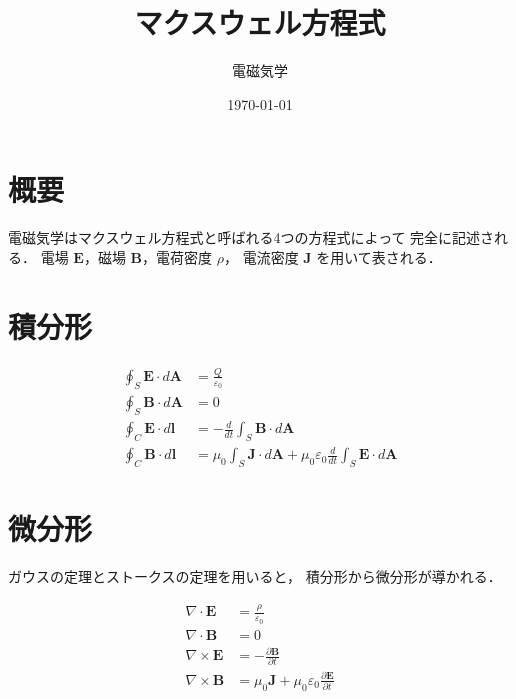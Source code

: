 \documentclass[lualatex, a4paper, 12pt]{jlreq}
\title{マクスウェル方程式}
\author{電磁気学}
\date{\today}
\begin{document}
\maketitle

\section{概要}

電磁気学はマクスウェル方程式と呼ばれる4つの方程式によって
完全に記述される．
電場 $\bm{E}$，磁場 $\bm{B}$，電荷密度 $\rho$，
電流密度 $\bm{J}$ を用いて表される．

\section{積分形}

\begin{align}
  \oint_S \bm{E} \cdot d\bm{A}
    &= \frac{Q}{\varepsilon_0}
    \tag{ガウスの法則}
    \label{eq:gauss_e}
    \\[8pt]
  \oint_S \bm{B} \cdot d\bm{A}
    &= 0
    \tag{磁気のガウスの法則}
    \label{eq:gauss_b}
    \\[8pt]
  \oint_C \bm{E} \cdot d\bm{l}
    &= -\frac{d}{dt} \int_S \bm{B} \cdot d\bm{A}
    \tag{ファラデーの法則}
    \label{eq:faraday}
    \\[8pt]
  \oint_C \bm{B} \cdot d\bm{l}
    &= \mu_0 \int_S \bm{J} \cdot d\bm{A}
       + \mu_0 \varepsilon_0 \frac{d}{dt}
         \int_S \bm{E} \cdot d\bm{A}
    \tag{アンペール--マクスウェルの法則}
    \label{eq:ampere}
\end{align}

\section{微分形}

ガウスの定理とストークスの定理を用いると，
積分形から微分形が導かれる．

\begin{align}
  \nabla \cdot \bm{E}
    &= \frac{\rho}{\varepsilon_0}
    \tag{ガウスの法則}
    \label{eq:gauss_e_diff}
    \\[8pt]
  \nabla \cdot \bm{B}
    &= 0
    \tag{磁気のガウスの法則}
    \label{eq:gauss_b_diff}
    \\[8pt]
  \nabla \times \bm{E}
    &= -\frac{\partial \bm{B}}{\partial t}
    \tag{ファラデーの法則}
    \label{eq:faraday_diff}
    \\[8pt]
  \nabla \times \bm{B}
    &= \mu_0 \bm{J}
       + \mu_0 \varepsilon_0 \frac{\partial \bm{E}}{\partial t}
    \tag{アンペール--マクスウェルの法則}
    \label{eq:ampere_diff}
\end{align}
\end{document}

